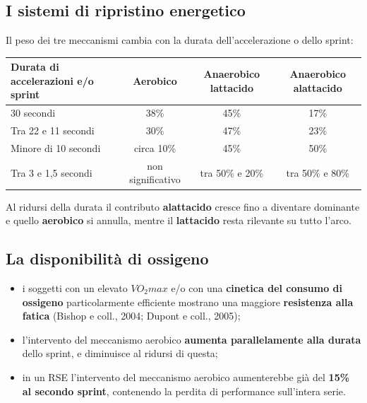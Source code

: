 \subsection{I sistemi di ripristino energetico}

Il peso dei tre meccanismi cambia con la durata dell'accelerazione o dello sprint:

\begin{table}[htbp]
  \centering
  \small
  \renewcommand{\arraystretch}{1.3}
  \begin{tabularx}{\textwidth}{|X|c|c|c|}
    \hline
    \textbf{Durata di accelerazioni e/o sprint} & \textbf{Aerobico} &
      \textbf{Anaerobico lattacido} & \textbf{Anaerobico alattacido} \\
    \hline
    30 secondi & 38\% & 45\% & 17\% \\
    \hline
    Tra 22 e 11 secondi & 30\% & 47\% & 23\% \\
    \hline
    Minore di 10 secondi & circa 10\% & 45\% & 50\% \\
    \hline
    Tra 3 e 1,5 secondi & non significativo & tra 50\% e 20\% & tra 50\% e 80\% \\
    \hline
  \end{tabularx}
\end{table}

Al ridursi della durata il contributo \textbf{alattacido} cresce fino a diventare dominante e quello
\textbf{aerobico} si annulla, mentre il \textbf{lattacido} resta rilevante su tutto l'arco.

\subsection{La disponibilità di ossigeno}

\begin{itemize}
  \item i soggetti con un elevato $VO_2max$ e/o con una \textbf{cinetica del consumo di ossigeno}
    particolarmente efficiente mostrano una maggiore \textbf{resistenza alla fatica} (Bishop e
    coll., 2004; Dupont e coll., 2005);
  \item l'intervento del meccanismo aerobico \textbf{aumenta parallelamente alla durata} dello
    sprint, e diminuisce al ridursi di questa;
  \item in un RSE l'intervento del meccanismo aerobico aumenterebbe già del \textbf{15\% al secondo
    sprint}, contenendo la perdita di performance sull'intera serie.
\end{itemize}

